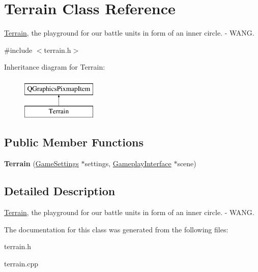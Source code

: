 \hypertarget{class_terrain}{}\section{Terrain Class Reference}
\label{class_terrain}


\hyperlink{class_terrain}{Terrain}, the playground for our battle units in form of an inner circle. -\/ W\+A\+NG.  




{\ttfamily \#include $<$terrain.\+h$>$}

Inheritance diagram for Terrain\+:\begin{figure}[H]
\begin{center}
\leavevmode
\includegraphics[height=2.000000cm]{class_terrain}
\end{center}
\end{figure}
\subsection*{Public Member Functions}
\begin{DoxyCompactItemize}
\item 
{\bfseries Terrain} (\hyperlink{class_game_settings}{Game\+Settings} $\ast$settings, \hyperlink{class_gameplay_interface}{Gameplay\+Interface} $\ast$scene)\hypertarget{class_terrain_ac711fed419262cbf10491cd392c0669b}{}\label{class_terrain_ac711fed419262cbf10491cd392c0669b}

\end{DoxyCompactItemize}


\subsection{Detailed Description}
\hyperlink{class_terrain}{Terrain}, the playground for our battle units in form of an inner circle. -\/ W\+A\+NG. 

The documentation for this class was generated from the following files\+:\begin{DoxyCompactItemize}
\item 
terrain.\+h\item 
terrain.\+cpp\end{DoxyCompactItemize}
